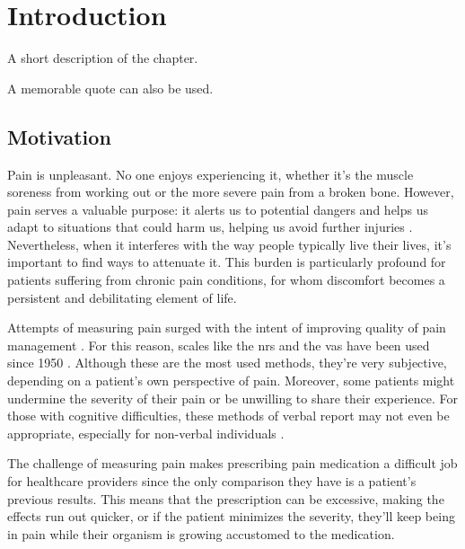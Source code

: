 \chapter{Introduction}%
\label{chapter:introduction}

\begin{introduction}
A short description of the chapter.

A memorable quote can also be used.
\end{introduction}


\section{Motivation}
Pain is unpleasant. No one enjoys experiencing it, whether it's the muscle soreness from working out or the more severe pain from a broken bone. However, pain serves a valuable purpose: it alerts us to potential dangers and helps us adapt to situations that could harm us, helping us avoid further injuries \cite{Coninx2021}. Nevertheless, when it interferes with the way people typically live their lives, it's important to find ways to attenuate it. This burden is particularly profound for patients suffering from chronic pain conditions, for whom discomfort becomes a persistent and debilitating element of life.

Attempts of measuring pain surged with the intent of improving quality of pain management \cite{Nugent2021}. For this reason, scales like the \ac{nrs} and the \ac{vas} have been used since 1950 \cite{Bielewicz2022}. Although these are the most used methods, they're very subjective, depending on a patient's own perspective of pain. Moreover, some patients might undermine the severity of their pain or be unwilling to share their experience. For those with cognitive difficulties, these methods of verbal report may not even be appropriate, especially for non-verbal individuals \cite{Qin2022}.

The challenge of measuring pain makes prescribing pain medication a difficult job for healthcare providers since the only comparison they have is a patient's previous results. This means that the prescription can be excessive, making the effects run out quicker, or if the patient minimizes the severity, they'll keep being in pain while their organism is growing accustomed to the medication.









